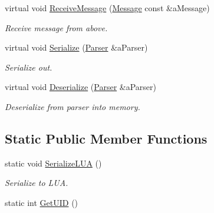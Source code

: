 \begin{DoxyCompactItemize}
virtual void \hyperlink{classChemistryElement_ab01661c92d69ef48b0f427ebc2cc15b8}{Receive\+Message} (\hyperlink{classMessage}{Message} const \&a\+Message)
\begin{DoxyCompactList}\small\item\em Receive message from above. \end{DoxyCompactList}\item 
virtual void \hyperlink{classChemistryElement_ab1f83928a5f589f0c5a8bdf0848c07cc}{Serialize} (\hyperlink{classParser}{Parser} \&a\+Parser)
\begin{DoxyCompactList}\small\item\em Serialize out. \end{DoxyCompactList}\item 
virtual void \hyperlink{classChemistryElement_a963adac4f720d945ec6a291bfaa81063}{Deserialize} (\hyperlink{classParser}{Parser} \&a\+Parser)
\begin{DoxyCompactList}\small\item\em Deserialize from parser into memory. \end{DoxyCompactList}\end{DoxyCompactItemize}
\subsection*{Static Public Member Functions}
\begin{DoxyCompactItemize}
\item 
static void \hyperlink{classChemistryElement_ac602fb84adabb34a1fa60456fb613933}{Serialize\+L\+UA} ()
\begin{DoxyCompactList}\small\item\em Serialize to L\+UA. \end{DoxyCompactList}\item 
static int \hyperlink{classChemistryElement_a90f3faa259f360ba7f212568beef5252}{Get\+U\+ID} ()
\end{DoxyCompactItemize}
